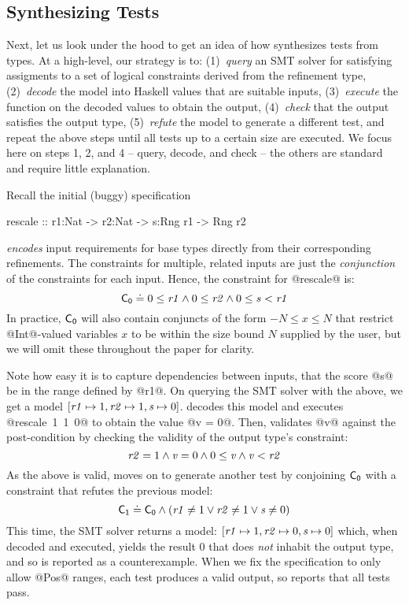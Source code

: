 \subsection{Synthesizing Tests} 
\label{sec:synthesizing-tests}
Next, let us look under the hood to get an idea of how \toolname 
synthesizes tests from types. 
At a high-level, our strategy is to:
%
(1)~\emph{query}   an SMT solver for satisfying assigments to a set of logical 
                   constraints derived from the refinement type,
(2)~\emph{decode}  the model into Haskell values that are suitable inputs,
(3)~\emph{execute} the function on the decoded values to obtain the output, 
(4)~\emph{check}   that the output satisfies the output type,
(5)~\emph{refute}  the model to generate a different test, and 
repeat the above steps until all tests up to a certain size are executed.
%
We focus here on steps 1, 2, and 4 -- query, decode, and check -- the others are 
standard and require little explanation.

Recall the initial (buggy) specification
%
\begin{code}
  rescale :: r1:Nat -> r2:Nat -> s:Rng r1 -> Rng r2 
\end{code}
%
\toolname \emph{encodes} input requirements for base types directly 
from their corresponding refinements. The constraints for multiple, 
related inputs are just the \emph{conjunction} of the constraints 
for each input. Hence, the constraint for @rescale@ is:
%
$$
\mathsf{{C_0}} \doteq 0 \leq \mathit{{r1}} \wedge 0 \leq \mathit{{r2}} \wedge 0 \leq s < \mathit{{r1}} 
$$
%
In practice, $\mathsf{{C_0}}$ will also contain conjuncts of the form $-N \leq x \leq N$ that
restrict @Int@-valued variables $x$ to be within the size bound $N$ supplied by
the user, but we will omit these throughout the paper for clarity.

Note how easy it is to capture dependencies between inputs, 
\eg that the score @s@ be in the range defined by @r1@.
%
On querying the SMT solver with the above, we get a model
%
$[\mathit{{r1}} \mapsto 1, \mathit{{r2}} \mapsto 1, \mathit{{s}}  \mapsto 0]$.
%
\toolname decodes this model and executes \hbox{@rescale 1 1 0@} to obtain the value @v = 0@.
%
Then, \toolname validates @v@ against the post-condition by checking 
the validity of the output type's constraint: 
%
$$\mathit{{r2}} = 1 \wedge \mathit{{v}} = 0 \wedge 0 \leq \mathit{{v}} \wedge \mathit{{v}} < \mathit{{r2}}$$
%
As the above is valid, \toolname moves on to generate another 
test by conjoining $\mathsf{{C_0}}$ with a constraint that refutes 
the previous model:
%
$$
\mathsf{{C_1}} \doteq \mathsf{{C_0}} \wedge (\mathit{{r1}} \not = 1 \vee \mathit{{r2}} \not = 1 \vee \mathit{{s}} \not = 0)
$$
This time, the SMT solver returns a model: 
%
$[\mathit{{r1}} \mapsto 1, \mathit{{r2}} \mapsto 0, \mathit{{s}} \mapsto 0]$
%
which, when decoded and executed, yields the result $0$ that does \emph{not} 
inhabit the output type, and so is reported as a counterexample. 
%
When we fix the specification to only allow @Pos@ ranges, each test produces
a valid output, so \toolname reports that all tests pass.

